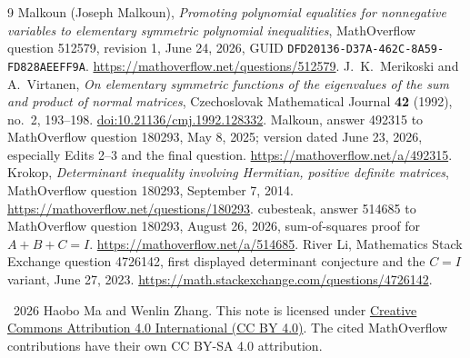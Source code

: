 \documentclass[11pt]{article}
\newcommand{\Id}{I}
\begin{document}
\begin{thebibliography}{9}
 Malkoun (Joseph Malkoun),
\emph{Promoting polynomial equalities for nonnegative variables to elementary
symmetric polynomial inequalities}, MathOverflow question 512579,
revision 1, June 24, 2026, GUID
\texttt{DFD20136-D37A-462C-8A59-FD828AEEFF9A}.
\url{https://mathoverflow.net/questions/512579}.
 J.~K.~Merikoski and A.~Virtanen,
\emph{On elementary symmetric functions of the eigenvalues of the sum and
product of normal matrices}, Czechoslovak Mathematical Journal
\textbf{42} (1992), no.~2, 193--198.
\href{https://doi.org/10.21136/cmj.1992.128332}{doi:10.21136/cmj.1992.128332}.
 Malkoun, answer 492315 to MathOverflow question 180293,
May 8, 2025; version dated June 23, 2026, especially Edits 2--3 and the final question.
\url{https://mathoverflow.net/a/492315}.
 Krokop, \emph{Determinant inequality involving Hermitian,
positive definite matrices}, MathOverflow question 180293, September 7, 2014.
\url{https://mathoverflow.net/questions/180293}.
 cubesteak, answer 514685 to MathOverflow question 180293,
August 26, 2026, sum-of-squares proof for $A+B+C=\Id$.
\url{https://mathoverflow.net/a/514685}.
 River Li, Mathematics Stack Exchange question 4726142,
first displayed determinant conjecture and the $C=\Id$ variant,
June 27, 2023.
\url{https://math.stackexchange.com/questions/4726142}.
\end{thebibliography}
\medskip\noindent\small
\textcopyright\ 2026 Haobo Ma and Wenlin Zhang.
This note is licensed under
\href{https://creativecommons.org/licenses/by/4.0/}{Creative Commons Attribution 4.0 International (CC BY 4.0)}.
The cited MathOverflow contributions have their own CC BY-SA 4.0 attribution.
\end{document}
